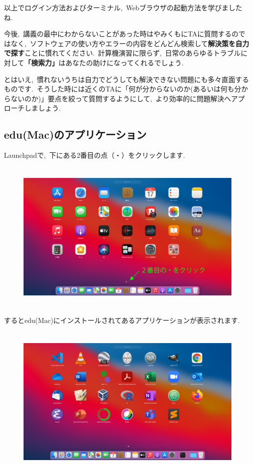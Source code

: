 \documentclass{jarticle}
\begin{document}
以上でログイン方法およびターミナル,\ Webブラウザの起動方法を学びましたね.\ 

今後,\ 講義の最中にわからないことがあった時はやみくもにTAに質問するのではなく,\ ソフトウェアの使い方やエラーの内容をどんどん検索して{\bf 解決策を自力で探す}ことに慣れてください.\ 
計算機演習に限らず,\ 日常のあらゆるトラブルに対して{\bf 「検索力」}はあなたの助けになってくれるでしょう.\ 

とはいえ,\ 慣れないうちは自力でどうしても解決できない問題にも多々直面するものです.\ そうした時には近くのTAに「何が分からないのか(あるいは何も分からないのか)」要点を絞って質問するようにして,\ より効率的に問題解決へアプローチしましょう.\ 

\subsection{edu(Mac)のアプリケーション}
Launchpadで,\ 下にある2番目の点（・）をクリックします.\ 
\begin{figure}[H]
  \centering
  \includegraphics[height=7.5cm]{fig/MacLaunchpadClick2.png}
\end{figure}

\newpage
するとedu(Mac)にインストールされてあるアプリケーションが表示されます.\ 
\begin{figure}[H]
  \centering
  \includegraphics[height=7.5cm]{fig/MacLaunchpad2.png}
\end{figure}
\end{document}
